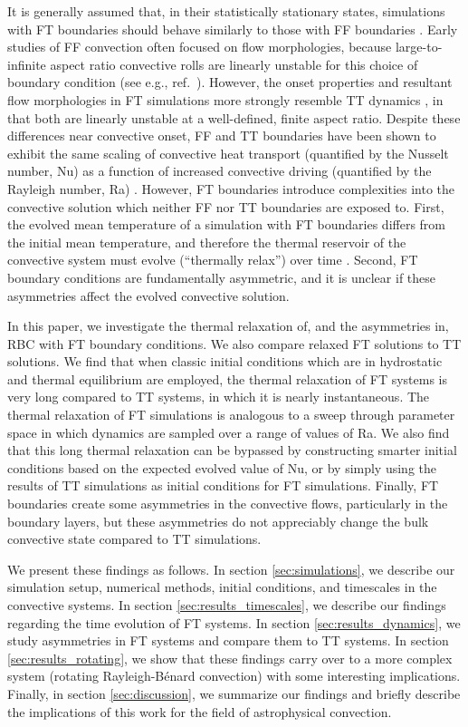\documentclass[aps, pre, onecolumn, nofootinbib, notitlepage, groupedaddress, amsfonts, amssymb, amsmath, longbibliography, superscriptaddress]{revtex4-1}
\newcommand{\RB}{Rayleigh-B\'{e}nard }
\newcommand{\ea}[1]{{\color{red} #1}}
\begin{document}
It is generally assumed that, in their statistically stationary states, simulations with FT boundaries should behave similarly to those with FF boundaries \cite{goluskin2016, otero&all2002}.
Early studies of FF convection often focused on flow morphologies, because large-to-infinite aspect ratio convective rolls are linearly unstable for this choice of boundary condition (see e.g., ref.~\cite{chapman&proctor1980}).
However, the onset properties and resultant flow morphologies in FT simulations more strongly resemble TT dynamics \cite{ishiwatari&all1994}, in that both are linearly unstable at a well-defined, finite aspect ratio.
Despite these differences near convective onset, FF and TT boundaries have been shown to exhibit the same scaling of convective heat transport (quantified by the Nusselt number, Nu) as a function of increased convective driving (quantified by the Rayleigh number, Ra) \cite{johnston&doering2009}.
However, FT boundaries introduce complexities into the convective solution which neither FF nor TT boundaries are exposed to.
First, the evolved mean temperature of a simulation with FT boundaries differs from the initial mean temperature, and therefore the thermal reservoir of the convective system must evolve (``thermally relax'') over time \cite{anders&all2018}.
Second, FT boundary conditions are fundamentally asymmetric, and it is unclear if these asymmetries affect the evolved convective solution.

In this paper, we investigate the thermal relaxation of, and the asymmetries in, RBC with FT boundary conditions.
We also compare relaxed FT solutions to TT solutions.
\ea{We find that} when classic initial conditions which are in hydrostatic and thermal equilibrium are employed, the thermal relaxation of FT systems is very long compared to TT systems, in which it is nearly instantaneous.
The thermal relaxation of FT simulations is analogous to a sweep through parameter space in which dynamics are sampled over a range of values of Ra.
We \ea{also} find that this long thermal relaxation can be bypassed by constructing smarter initial conditions based on the expected evolved value of Nu, or by simply using the results of TT simulations as initial conditions for FT simulations.
Finally, FT boundaries create some asymmetries in the convective flows, particularly in the boundary layers, but these asymmetries do not appreciably change the bulk convective state compared to TT simulations.

We present these findings as follows.
In section \ref{sec:simulations}, we describe our simulation setup, numerical methods, initial conditions, and timescales in the convective systems.
In section \ref{sec:results_timescales}, we describe our findings regarding the time evolution of FT systems.
In section \ref{sec:results_dynamics}, we study asymmetries in FT systems and compare them to TT systems.
In section \ref{sec:results_rotating}, we show that these findings carry over to a more complex system (rotating \RB convection) with some interesting implications.
Finally, in section \ref{sec:discussion}, we summarize our findings and briefly describe the implications of this work for the field of astrophysical convection.
\end{document}
